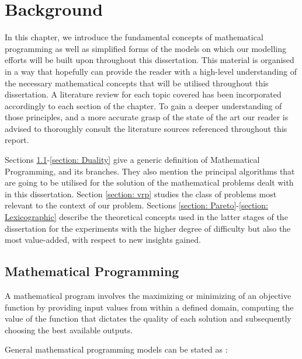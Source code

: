 \chapter{Background}
\label{chapter: Background}

In this chapter, we introduce the fundamental concepts of mathematical programming as well as simplified forms of the models on which our modelling efforts will be built upon throughout this dissertation. This material is organised in a way that hopefully can provide the reader with a high-level understanding of the necessary mathematical concepts that will be utilised throughout this dissertation. A literature review for each topic covered has been incorporated accordingly to each section of the chapter. To gain a deeper understanding of those principles, and a more accurate grasp of the state of the art our reader is advised to thoroughly consult the literature sources referenced throughout this report.

\vspace{\baselineskip}
\noindent
Sections \ref{section: 2.1}-\ref{section: Duality} give a generic definition of Mathematical Programming, and its branches. They also mention the principal algorithms that are going to be utilised for the solution of the mathematical problems dealt with in this dissertation. Section \ref{section: vrp} studies the class of problems most relevant to the context of our problem. Sections \ref{section: Pareto}-\ref{section: Lexicographic} describe the theoretical concepts used in the latter stages of the dissertation for the experiments with the higher degree of difficulty but also the most value-added, with respect to new insights gained.


\section{Mathematical Programming}
\label{section: 2.1}
A mathematical program involves the maximizing or minimizing of an objective function by providing input values from within a defined domain, computing the value of the function that dictates the quality of each solution and subsequently choosing the best available outputs.\par
\vspace{\baselineskip}
\noindent
General mathematical programming models can be stated as \cite{DUMMY:1}:



